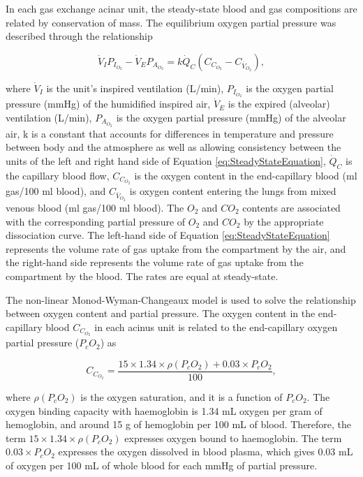 In each gas exchange acinar unit, the steady-state blood and gas compositions are related by conservation of mass. The equilibrium oxygen partial pressure was described through the relationship

\begin{equation} 
 \label{eq:SteadyStateEquation}
 \dot{V}_I P_{I_{O_2}} - \dot{V}_E P_{A_{O_2}} = k\dot{Q}_C(C_{C_{O_2}} - C_{\bar{V}_{O_2}}),
\end{equation}

\noindent where $\dot{V}_I$ is the unit's inspired ventilation (L/min), $P_{I_{O_2}}$ is the oxygen partial pressure (mmHg) of the humidified inspired air,  $\dot{V}_E$ is the expired (alveolar) ventilation (L/min), $P_{A_{O_2}}$ is the oxygen partial pressure (mmHg) of the alveolar air, k is a constant that accounts for differences in temperature and pressure between body and the atmosphere as well as allowing consistency between the units of the left and right hand side of Equation \ref{eq:SteadyStateEquation}, $\dot{Q}_C$ is the capillary blood flow, $C_{C_{O_2}}$ is the oxygen content in the end-capillary blood (ml gas/100 ml blood), and $C_{\bar{V}_{O_2}}$ is oxygen content entering the lungs from mixed venous blood (ml gas/100 ml blood). The $O_2$ and $CO_2$ contents are associated with the corresponding partial pressure of $O_2$ and $CO_2$ by the appropriate dissociation curve. The left-hand side of Equation \ref{eq:SteadyStateEquation} represents the volume rate of gas uptake from the compartment by the air, and the right-hand side represents the volume rate of gas uptake from the compartment by the blood. The rates are equal at steady-state.

The non-linear Monod-Wyman-Changeaux model \citep{monod1965nature} is used to solve the relationship between oxygen content and partial pressure. The oxygen content in the end-capillary blood $C_{C_{O_2}}$ in each acinus unit is related to the end-capillary oxygen partial pressure ($P_cO_2$) as

\begin{equation} 
 \label{eq:OxygenContent}
 C_{C_{O_2}} = \frac{15 \times 1.34 \times \rho(P_cO_2) + 0.03 \times P_cO_2}{100},
\end{equation}

\noindent where $\rho(P_cO_2)$ is the oxygen saturation, and it is a function of $P_cO_2$. The oxygen binding capacity with haemoglobin is 1.34 mL oxygen per gram of hemoglobin, and around 15 g of hemoglobin per 100 mL of blood. Therefore, the term $15 \times 1.34 \times \rho(P_cO_2)$ expresses oxygen bound to haemoglobin. The term $0.03 \times P_cO_2$ expresses the oxygen dissolved in blood plasma, which gives 0.03 mL of oxygen per 100 mL of whole blood for each mmHg of partial pressure.

